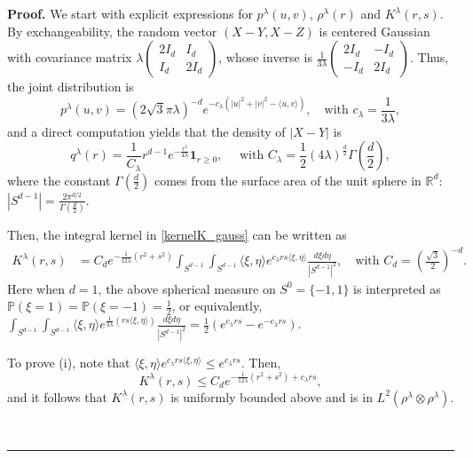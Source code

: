\documentclass[]{elsarticle}
\def\R{\mathbb{R}}
\def\lambdaG{\lambda}
\newcommand{\inp}[1]{\langle{#1}\rangle}
\newenvironment{proof}[1][Proof]{\noindent\textbf{#1.} }{\ \rule{0.5em}{0.5em}}
\numberwithin{equation}{section}
\numberwithin{theorem}{section}
\begin{document}
\begin{proof}  
We start with explicit expressions for  $p^\lambdaG(u,v)$, $\rho^\lambdaG(r)$ and $K^\lambdaG(r,s)$. 
By exchangeability, the random vector $(X-Y, X-Z)$ is centered Gaussian with covariance matrix $\lambdaG\begin{pmatrix}
 2  I_d      & I_d\\
I_d         & 2I_d 
 \end{pmatrix}$, whose inverse is $\frac{1}{3\lambdaG}\begin{pmatrix}
 2I_d    & -I_d\\
   -I_d   & 2I_d 
 \end{pmatrix}$. Thus, the joint distribution is 
 \[ p^\lambdaG(u,v) = (2\sqrt{3}\pi \lambdaG)^{-d} e^{-c_\lambdaG (|u|^2+|v|^2- \inp{u,v}) }, \quad \text{with } c_\lambdaG = \frac{1}{3\lambdaG},
 \]
 and a direct computation yields that the density of $|X-Y|$ is
 \[
 q^\lambdaG(r)= \frac{1}{C_\lambdaG} r^{d-1}e^{-\frac{r^2}{4\lambdaG}} \mathbf{1}_{r\geq 0}, \quad \text{ with } C_\lambdaG= \frac{1}{2} (4\lambdaG)^{\frac{d}{2}}\Gamma(\frac{d}{2}), 
 \]
where the constant $\Gamma(\frac{d}{2})$ comes from the surface area of the unit sphere in $\R^d$:  $|S^{d-1}|= \frac{2\pi^{d/2}}{\Gamma(\frac{d}{2})}$. 
  
  Then,  the integral kernel in \eqref{kernelK_gauss} can be written as
\begin{align*}
 K^\lambdaG(r,s) &= C_d e^{-\frac{1}{12\lambda}(r^2+s^2)}\int_{S^{d-1}}\int_{S^{d-1}}\inp{\xi,\eta} e^{c_\lambda rs\inp{\xi,\eta}} \frac{d\xi d\eta}{|S^{d-1}|^2}, \quad \text{with } C_d= (\frac{\sqrt{3}}{2})^{-d}.
 \end{align*}
 Here when $d=1$, the above spherical measure on $S^0= \{-1,1\}$ is interpreted as $\mathbb{P}(\xi=1) =\mathbb{P}(\xi=-1) = \frac{1}{2}$, or equivalently, $\int_{S^{d-1}}\int_{S^{d-1}}\inp{\xi,\eta} e^{\frac{1}{3\lambdaG}(rs\inp{\xi,\eta})} \frac{d\xi d\eta}{|S^{d-1}|^2} = \frac{1}{2}(e^{c_\lambda rs} -e^{-c_\lambda rs})$.  

To prove (i), note that $\inp{\xi,\eta}  e^{c_\lambdaG rs\inp{\xi,\eta}} \leq e^{c_\lambda rs}$. Then, 
\[K^\lambdaG(r,s) \leq C_d e^{-\frac{1}{12\lambda}(r^2+s^2) + c_\lambda rs},\]
 and it follows that $K^\lambdaG(r,s)$ is uniformly bounded above and is in $L^2(\rho^\lambdaG\otimes\rho^\lambdaG)$. 
 

\end{proof}
\end{document}
